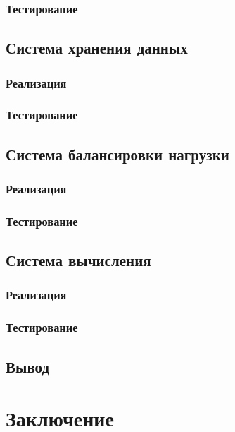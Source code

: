 \documentclass[a4paper,12pt]{report}
\numberwithin{equation}{section}
\begin{document}
\subsubsection{Тестирование}

\subsection{Система хранения данных}
\subsubsection{Реализация}

\subsubsection{Тестирование}

\subsection{Система балансировки нагрузки}
\subsubsection{Реализация}

\subsubsection{Тестирование}

\subsection{Система вычисления}
\subsubsection{Реализация}

\subsubsection{Тестирование}

\subsection{Вывод}

\clearpage
\section{Заключение}
\end{document}
